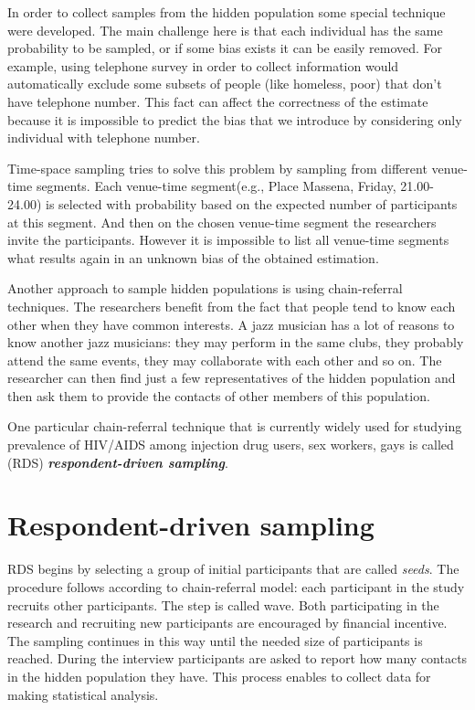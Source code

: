 \documentclass[12pt]{report}
\begin{document}
In order to collect samples from the hidden population some special technique were developed. The main challenge here is that each individual has the same probability to be sampled, or if some bias exists it can be easily removed. For example, using telephone survey in order to collect information would automatically exclude some subsets of people (like homeless, poor) that don't have telephone number. This fact can affect the correctness of the estimate because it is impossible to predict the bias that we introduce by considering only individual with telephone number. 

Time-space sampling tries to solve this problem by sampling from different venue-time segments. Each venue-time segment(e.g., Place Massena, Friday, 21.00-24.00) is selected with probability based on the expected number of participants at this segment. And then on the chosen venue-time segment the researchers invite the participants. However it is impossible to list all venue-time segments what results again in an unknown bias of the obtained estimation.

Another approach to sample hidden populations is using chain-referral techniques. The researchers benefit from the fact that people tend to know each other when they have common interests. A jazz musician has a lot of reasons to know another jazz musicians: they may perform in the same clubs, they probably attend the same events, they may collaborate with each other and so on. The researcher can then find just a few representatives of the hidden population and then ask them to provide the contacts of other members of this population.

One particular chain-referral technique that is currently widely used for studying prevalence of HIV/AIDS among injection drug users, sex workers, gays is called (RDS) \textit{\textbf{respondent-driven sampling}}.


\section{Respondent-driven sampling}
RDS begins by selecting a group of initial participants that are called \textit{seeds}. The procedure follows according to chain-referral model: each participant in the study recruits other participants. The step is called wave. Both participating in the research and recruiting new participants are encouraged by financial incentive. The sampling continues in this way until the needed size of participants is reached. During the interview participants are asked to report how many contacts in the hidden population they have.
This process enables to collect data for making statistical analysis.
\end{document}
